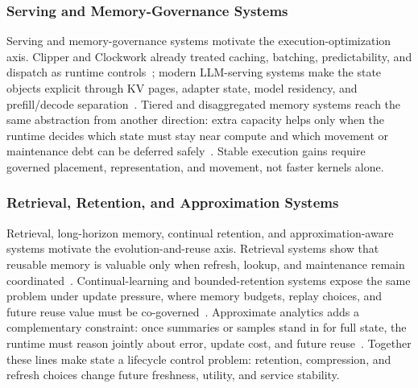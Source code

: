 ﻿\documentclass[manuscript]{acmart}
\begin{document}
\subsubsection{Serving and Memory-Governance Systems}

Serving and memory-governance systems motivate the execution-optimization axis. Clipper and Clockwork already treated caching, batching, predictability, and dispatch as runtime controls~\cite{crankshaw2017clipper,gujarati2020clockwork}; modern LLM-serving systems make the state objects explicit through KV pages, adapter state, model residency, and prefill/decode separation~\cite{kwon2023pagedattention,sheng2023slora,zheng2023sglang,agrawal2024sarathi,zhong2024distserve,patel2024splitwise,yu2025prism,zhang2025jenga}. Tiered and disaggregated memory systems reach the same abstraction from another direction: extra capacity helps only when the runtime decides which state must stay near compute and which movement or maintenance debt can be deferred safely~\cite{hu2024aceso,zhong2024unimem,jalalian2024extmem,raybuck2021hemem,cho2024coaxial,zhao2025equilibria,peng2024scalacache,wang2025finemem,chang2024gmt,li2024streamcache,qiu2025hotrap}. Stable execution gains require governed placement, representation, and movement, not faster kernels alone.

\subsubsection{Retrieval, Retention, and Approximation Systems}

Retrieval, long-horizon memory, continual retention, and approximation-aware systems motivate the evolution-and-reuse axis. Retrieval systems show that reusable memory is valuable only when refresh, lookup, and maintenance remain coordinated~\cite{guu2020realm,lewis2020rag,borgeaud2022retro,izacard2022atlas,asai2024selfrag,wang2024hipporag,sarthi2024raptor}. Continual-learning and bounded-retention systems expose the same problem under update pressure, where memory budgets, replay choices, and future reuse value must be co-governed~\cite{kirkpatrick2017ewc,lopez2017gem,rebuffi2017icarl,chaudhry2019agem,rolnick2019experience,aljundi2019mir,buzzega2020der,hayes2020remind,prabhu2020gdumb,delange2021survey}. Approximate analytics adds a complementary constraint: once summaries or samples stand in for full state, the runtime must reason jointly about error, update cost, and future reuse~\cite{agarwal2013blinkdb,goiri2015approxhadoop,wang2018approxjoin,hu2018streamapprox,chen2018incapprox}. Together these lines make state a lifecycle control problem: retention, compression, and refresh choices change future freshness, utility, and service stability.
\end{document}
